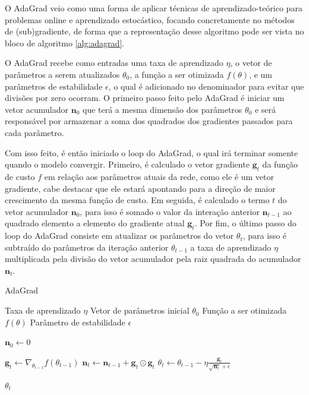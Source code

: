 O AdaGrad veio como uma forma de aplicar técnicas de aprendizado-teórico para problemas online e aprendizado estocástico, focando concretamente no métodos de (sub)gradiente, de forma que a representação desse algoritmo pode ser vista no bloco de algoritmo \ref{alg:adagrad}.

O AdaGrad recebe como entradas uma taxa de aprendizado $\eta$, o vetor de parâmetros a serem atualizados $\theta_0$, a função a ser otimizada $f(\theta)$, e um parâmetros de estabilidade $\epsilon$, o qual é adicionado no denominador para evitar que divisões por zero ocorram. O primeiro passo feito pelo AdaGrad é iniciar um vetor acumulador $\mathbf{n}_0$ que terá a mesma dimensão dos parâmetros $\theta_0$ e será responsável por armazenar a soma dos quadrados dos gradientes passados para cada parâmetro.

Com isso feito, é então iniciado o loop do AdaGrad, o qual irá terminar somente quando o modelo convergir. Primeiro, é calculado o vetor gradiente $\textbf{g}_t$ da função de custo $f$ em relação aos parâmetros atuais da rede, como ele é um vetor gradiente, cabe destacar que ele estará apontando para a direção de maior crescimento da mesma função de custo. Em seguida, é calculado o termo $t$ do vetor acumulador $\mathbf{n}_0$, para isso é somado o valor da interação anterior $\textbf{n}_{t-1}$ ao quadrado elemento a elemento do gradiente atual $\textbf{g}_t$. Por fim, o último passo do loop do AdaGrad consiste em atualizar os parâmetros do vetor $\theta_t$, para isso é subtraído do parâmetros da iteração anterior $\theta_{t-1}$ a taxa de aprendizado $\eta$ multiplicada pela divisão do vetor acumulador pela raiz quadrada do acumulador $\textbf{n}_t$.

\begin{algorithm}[H] %
    \caption{AdaGrad}
    \label{alg:adagrad}
    \begin{algorithmic}[1] %

    \Require Taxa de aprendizado $\eta$
    \Require Vetor de parâmetros inicial $\theta_0$
    \Require Função a ser otimizada $f(\theta)$
    \Require Parâmetro de estabilidade $\epsilon$

    \State $\mathbf{n}_0 \leftarrow 0$ 

        \State $\textbf{g}_t \leftarrow \nabla_{\theta_{t-1}} f(\theta_{t-1})$
        \State $\textbf{n}_t \leftarrow \textbf{n}_{t-1} + \mathbf{g}_t \odot \mathbf{g}_t$
        \State $\theta_t \leftarrow \theta_{t-1} - \eta \frac{\textbf{g}_t}{\sqrt{\textbf{n}_t} + \epsilon}$
    \EndWhile

    \State \Return $\theta_t$ 
    \end{algorithmic}
\end{algorithm}

